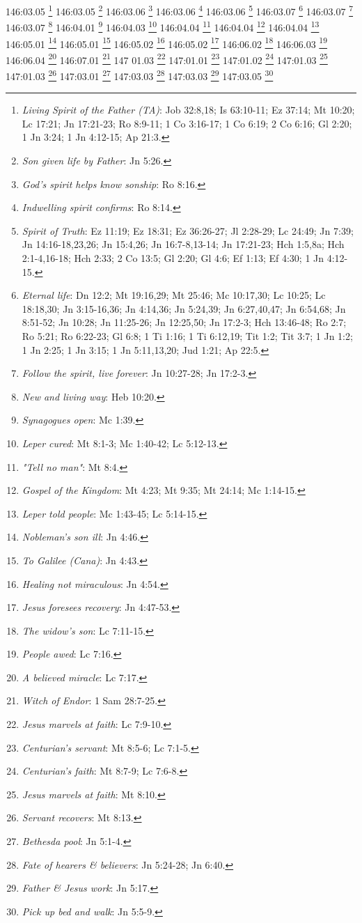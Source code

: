 146:03.05 \footnote{\textit{Living Spirit of the Father (TA)}: Job 32:8,18; Is 63:10-11; Ez 37:14; Mt 10:20; Lc 17:21; Jn 17:21-23; Ro 8:9-11; 1 Co 3:16-17; 1 Co 6:19; 2 Co 6:16; Gl 2:20; 1 Jn 3:24; 1 Jn 4:12-15; Ap 21:3.}
146:03.05 \footnote{\textit{Son given life by Father}: Jn 5:26.}
146:03.06 \footnote{\textit{God's spirit helps know sonship}: Ro 8:16.}
146:03.06 \footnote{\textit{Indwelling spirit confirms}: Ro 8:14.}
146:03.06 \footnote{\textit{Spirit of Truth}: Ez 11:19; Ez 18:31; Ez 36:26-27; Jl 2:28-29; Lc 24:49; Jn 7:39; Jn 14:16-18,23,26; Jn 15:4,26; Jn 16:7-8,13-14; Jn 17:21-23; Hch 1:5,8a; Hch 2:1-4,16-18; Hch 2:33; 2 Co 13:5; Gl 2:20; Gl 4:6; Ef 1:13; Ef 4:30; 1 Jn 4:12-15.}
146:03.07 \footnote{\textit{Eternal life}: Dn 12:2; Mt 19:16,29; Mt 25:46; Mc 10:17,30; Lc 10:25; Lc 18:18,30; Jn 3:15-16,36; Jn 4:14,36; Jn 5:24,39; Jn 6:27,40,47; Jn 6:54,68; Jn 8:51-52; Jn 10:28; Jn 11:25-26; Jn 12:25,50; Jn 17:2-3; Hch 13:46-48; Ro 2:7; Ro 5:21; Ro 6:22-23; Gl 6:8; 1 Ti 1:16; 1 Ti 6:12,19; Tit 1:2; Tit 3:7; 1 Jn 1:2; 1 Jn 2:25; 1 Jn 3:15; 1 Jn 5:11,13,20; Jud 1:21; Ap 22:5.}
146:03.07 \footnote{\textit{Follow the spirit, live forever}: Jn 10:27-28; Jn 17:2-3.}
146:03.07 \footnote{\textit{New and living way}: Heb 10:20.}
146:04.01 \footnote{\textit{Synagogues open}: Mc 1:39.}
146:04.03 \footnote{\textit{Leper cured}: Mt 8:1-3; Mc 1:40-42; Lc 5:12-13.}
146:04.04 \footnote{\textit{"Tell no man"}: Mt 8:4.}
146:04.04 \footnote{\textit{Gospel of the Kingdom}: Mt 4:23; Mt 9:35; Mt 24:14; Mc 1:14-15.}
146:04.04 \footnote{\textit{Leper told people}: Mc 1:43-45; Lc 5:14-15.}
146:05.01 \footnote{\textit{Nobleman's son ill}: Jn 4:46.}
146:05.01 \footnote{\textit{To Galilee (Cana)}: Jn 4:43.}
146:05.02 \footnote{\textit{Healing not miraculous}: Jn 4:54.}
146:05.02 \footnote{\textit{Jesus foresees recovery}: Jn 4:47-53.}
146:06.02 \footnote{\textit{The widow's son}: Lc 7:11-15.}
146:06.03 \footnote{\textit{People awed}: Lc 7:16.}
146:06.04 \footnote{\textit{A believed miracle}: Lc 7:17.}
146:07.01 \footnote{\textit{Witch of Endor}: 1 Sam 28:7-25.}
147 01.03 \footnote{\textit{Jesus marvels at faith}: Lc 7:9-10.}
147:01.01 \footnote{\textit{Centurian's servant}: Mt 8:5-6; Lc 7:1-5.}
147:01.02 \footnote{\textit{Centurian's faith}: Mt 8:7-9; Lc 7:6-8.}
147:01.03 \footnote{\textit{Jesus marvels at faith}: Mt 8:10.}
147:01.03 \footnote{\textit{Servant recovers}: Mt 8:13.}
147:03.01 \footnote{\textit{Bethesda pool}: Jn 5:1-4.}
147:03.03 \footnote{\textit{Fate of hearers & believers}: Jn 5:24-28; Jn 6:40.}
147:03.03 \footnote{\textit{Father & Jesus work}: Jn 5:17.}
147:03.05 \footnote{\textit{Pick up bed and walk}: Jn 5:5-9.}
